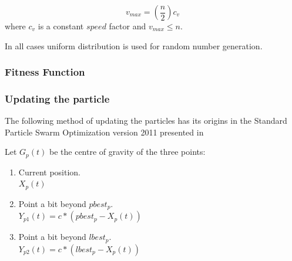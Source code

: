 \documentclass{article}
\begin{document}
\begin{equation}
	v_{max} = (\frac{n}{2})c_{v}
\end{equation}
where $c_{v}$ is a constant $speed$ factor and $v_{max} \leq n$.

In all cases uniform distribution is used for random number generation.

\subsubsection{Fitness Function}\label{sec:fitness}

\subsubsection{Updating the particle}




%



The following method of updating the particles has its origins in the Standard Particle Swarm Optimization version 2011 presented in~\cite{pso_11}

Let $G_p(t)$ be the centre of gravity of the three points:
\begin{enumerate}
	\item Current position. \\
	$X_p(t)$
	
	\item Point a bit beyond $pbest_p$. \\
	$Y_{p1}(t) = c*(pbest_p-X_p(t))$
	
	\item Point a bit beyond $lbest_p$. \\
	$Y_{p2}(t) = c*(lbest_p-X_p(t))$
			
\end{enumerate}
\end{document}
